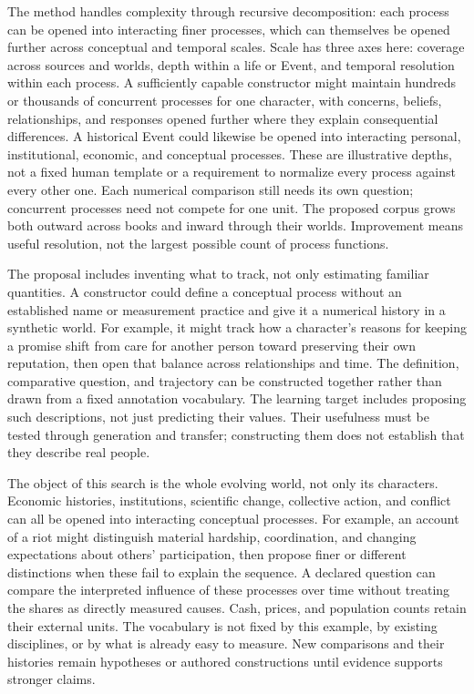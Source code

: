 \documentclass[10pt]{article}
\begin{document}
The method handles complexity through recursive decomposition: each process
can be opened into interacting finer processes, which can themselves be opened
further across conceptual and temporal scales.
Scale has three axes here: coverage across sources and worlds, depth within a
life or Event, and temporal resolution within each process. A sufficiently
capable constructor might maintain hundreds or thousands of concurrent
processes for one character, with concerns, beliefs, relationships, and
responses opened further where they explain consequential differences. A
historical Event could likewise be opened into interacting personal,
institutional, economic, and conceptual processes. These are illustrative
depths, not a fixed human template or a requirement to normalize every process
against every other one. Each numerical comparison still needs its own
question; concurrent processes need not compete for one unit. The proposed
corpus grows both outward across books and inward through their worlds.
Improvement means useful resolution, not the largest possible count of process functions.

The proposal includes inventing what to track, not only estimating familiar
quantities. A constructor could define a conceptual process without an
established name or measurement practice and give it a numerical history in a
synthetic world. For example, it might track how a character's reasons for
keeping a promise shift from care for another person toward preserving their
own reputation, then open that balance across relationships and time. The
definition, comparative question, and trajectory can be constructed together
rather than drawn from a fixed annotation vocabulary. The learning target
includes proposing such descriptions, not just predicting their values.
Their usefulness must be tested through generation and transfer; constructing
them does not establish that they describe real people.

The object of this search is the whole evolving world, not only its
characters. Economic histories, institutions, scientific change, collective
action, and conflict can all be opened into interacting conceptual processes.
For example, an account of a riot might distinguish material hardship,
coordination, and changing expectations about others' participation, then
propose finer or different distinctions when these fail to explain the
sequence. A declared question can compare the interpreted influence of these
processes over time without treating the shares as directly measured causes.
Cash, prices, and population counts retain their external units. The vocabulary
is not fixed by this example, by existing disciplines, or by what is already
easy to measure. New comparisons and their histories remain hypotheses or
authored constructions until evidence supports stronger claims.
\end{document}
